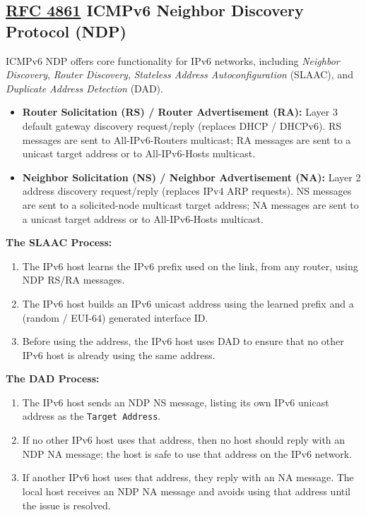 \documentclass[12pt]{article}
\newcommand{\RFC}[1]{\href{https://datatracker.ietf.org/doc/html/rfc#1}{RFC #1}}
\begin{document}
	\subsection{\RFC{4861} ICMPv6 Neighbor Discovery Protocol (NDP) \label{subsec:NDP}}
	ICMPv6 NDP offers core functionality for IPv6 networks, including \textit{Neighbor Discovery}, \textit{Router Discovery}, \textit{Stateless Address Autoconfiguration} (SLAAC), and \textit{Duplicate Address Detection} (DAD).

	\begin{itemize}
		\label{itm:NDP MESSAGES}
		\item{\textbf{Router Solicitation (RS) / Router Advertisement (RA):} Layer 3 default gateway discovery request/reply (replaces DHCP / DHCPv6). RS messages are sent to All-IPv6-Routers multicast; RA messages are sent to a unicast target address or to All-IPv6-Hosts multicast.}
		\item{\textbf{Neighbor Solicitation (NS) / Neighbor Advertisement (NA):} Layer 2 address discovery request/reply (replaces IPv4 ARP requests). NS messages are sent to a solicited-node multicast target address; NA messages are sent to a unicast target address or to All-IPv6-Hosts multicast.}
	\end{itemize}

	\textbf{The SLAAC Process:}
	\begin{enumerate} \itemsep -5pt
		\label{itm:NDP SLAAC}
		\item{The IPv6 host learns the IPv6 prefix used on the link, from any router, using NDP RS/RA messages.}
		\item{The IPv6 host builds an IPv6 unicast address using the learned prefix and a (random / EUI-64) generated interface ID.}
		\item{Before using the address, the IPv6 host uses DAD to ensure that no other IPv6 host is already using the same address.}
	\end{enumerate}

	\textbf{The DAD Process:}
	\begin{enumerate} \itemsep -5pt
		\label{itm:NDP DAD}
		\item{The IPv6 host sends an NDP NS message, listing its own IPv6 unicast address as the \texttt{Target Address}.}
		\item{If no other IPv6 host uses that address, then no host should reply with an NDP NA message; the host is safe to use that address on the IPv6 network.}
		\item{If another IPv6 host uses that address, they reply with an NA message. The local host receives an NDP NA message and avoids using that address until the issue is resolved.}
	\end{enumerate}
\end{document}
